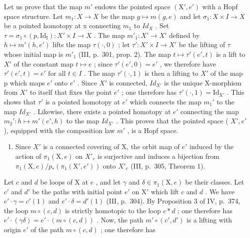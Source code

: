 Let us prove that the map \(m'\) endows the pointed space \((\mathrm{X}', e')\) with a Hopf space structure. Let \(m_1 \colon X \to X\) be the map \(g \mapsto m(g, e)\) and let \(\sigma_1 \colon X \times I \to X\) be a pointed homotopy at x connecting \(m_1\) to \(Id_X\) . Set \(\tau = \sigma_1 \circ (p, \mathrm{Id_I}) \colon X' \times I \to X\) . The map \(m'_1 \colon X' \to X'\) defined by \(h \mapsto m'(h, e')\) lifts the map \(\tau(\cdot, 0)\) ; let \(\tau' \colon X' \times I \to X'\) be the lifting of \(\tau\) whose initial map is \(m'_1\) (III, p.~301, prop. 2). The map \(t \mapsto \tau'(e', t)\) is a lift to \(X'\) of the constant map \(t \mapsto e\) ; since \(\tau'(e', 0) = e'\) , we therefore have \(\tau'(e', t) = e'\) for all \(t \in I\) . The map \(\tau'(\cdot, 1)\) is then a lifting to \(X'\) of the map p which maps \(e'\) onto \(e'\) . Since \(X'\) is connected, \(Id_{X'}\) is the unique X-morphism from \(X'\) to itself that fixes the point \(e'\) ; one therefore has \(\tau'(\cdot,1)=\mathrm{Id}_{\mathrm{X}'}\) . This shows that \(\tau'\) is a pointed homotopy at \(e'\) which connects the map \(m_{1}'\) to the map \(Id_{X'}\) . Likewise, there exists a pointed homotopy at \(e'\) connecting the map \(m_{2}'\colon h\mapsto m'(e',h)\) to the map \(Id_{X'}\) . This proves that the pointed space ( \(X',e'\) ), equipped with the composition law \(m'\) , is a Hopf space.

\begin{enumerate}
\def\labelenumi{\alph{enumi})}
\setcounter{enumi}{2}
\tightlist
\item
  Since \(X'\) is a connected covering of X, the orbit map of \(e'\) induced by the action of \(\pi_{1}(\mathrm{X},e)\) on \(X'_{e}\) is surjective and induces a bijection from \(\pi_{1}(\mathrm{X},e)/p_{*}(\pi_{1}(\mathrm{X}',e'))\) onto \(X'_{e}\) (III, p.~305, Theorem 1).
\end{enumerate}

Let \(c\) and \(d\) be loops of X at \(e\) , and let \(\gamma\) and \(\delta \in \pi_1(\mathrm{X},e)\) be their classes. Let \(c'\) and \(d'\) be the paths with initial point \(e'\) on \(\mathrm{X}'\) which lift \(c\) and \(d\) . We have \(e' \cdot \gamma = c'(1)\) and \(e' \cdot \delta = d'(1)\) (III, p.~304). By Proposition 3 of IV, p.~374, the loop \(m \circ (c,d)\) is strictly homotopic to the loop \(c*d\) ; one therefore has \(e' \cdot (\gamma\delta) = e' \cdot (m \circ (c,d))\) . Now, the path \(m' \circ (c',d')\) is a lifting with origin \(e'\) of the path \(m \circ (c,d)\) ; one therefore has

